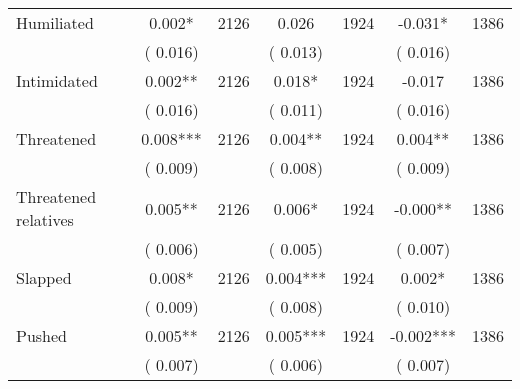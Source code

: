 \begin{tabular}{l*{6}{c}}
Humiliated        &              0.002*      &       2126       &              0.026      &       1924       &             -0.031*      &       1386       \\
                       &       (       0.016)            &                               &       (       0.013)            &                               &       (       0.016)            &                               \\
Intimidated        &              0.002**      &       2126       &              0.018*      &       1924       &             -0.017      &       1386       \\
                       &       (       0.016)            &                               &       (       0.011)            &                               &       (       0.016)            &                               \\
Threatened        &              0.008***      &       2126       &              0.004**      &       1924       &              0.004**      &       1386       \\
                       &       (       0.009)            &                               &       (       0.008)            &                               &       (       0.009)            &                               \\
Threatened relatives        &              0.005**      &       2126       &              0.006*      &       1924       &             -0.000**      &       1386       \\
                       &       (       0.006)            &                               &       (       0.005)            &                               &       (       0.007)            &                               \\
Slapped        &              0.008*      &       2126       &              0.004***      &       1924       &              0.002*      &       1386       \\
                       &       (       0.009)            &                               &       (       0.008)            &                               &       (       0.010)            &                               \\
Pushed        &              0.005**      &       2126       &              0.005***      &       1924       &             -0.002***      &       1386       \\
                       &       (       0.007)            &                               &       (       0.006)            &                               &       (       0.007)            &                               \\

\end{tabular}
